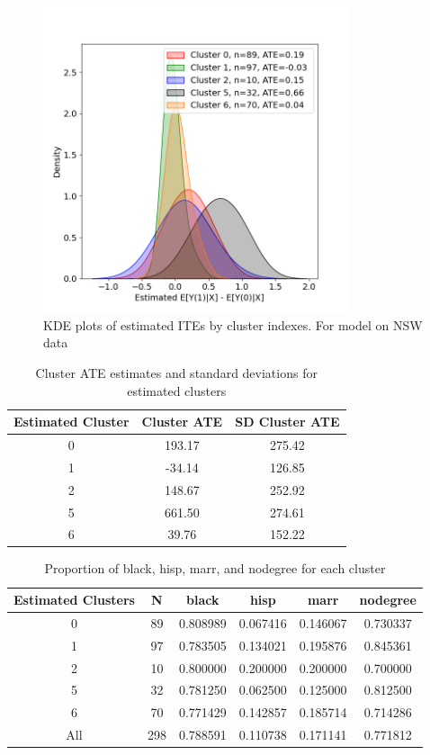 \documentclass{article}
\begin{document}
\begin{figure}[h]
  \centering
  \includegraphics[width=0.8\textwidth]{Plots/NSW_output_histogram.png}
  \caption{KDE plots of estimated ITEs by cluster indexes. For model on NSW data}
  \label{fig:nsw_histo}
\end{figure}

\begin{table}[H]
\centering
\label{tab:cluster_ate}
\begin{tabular}{c|c c}
\hline
\textbf{Estimated Cluster} & \textbf{Cluster ATE} & \textbf{SD Cluster ATE} \\ \hline
0 & 193.17 & 275.42 \\
1 & -34.14 & 126.85 \\
2 & 148.67 & 252.92 \\
5 & 661.50 & 274.61 \\
6 & 39.76 & 152.22 \\
\hline
\end{tabular}
\caption{Cluster ATE estimates and standard deviations for estimated clusters}
\label{tab:nsw_ate_results}
\end{table}

\begin{table}[H]
\centering
\label{tab:clusters}
\begin{tabular}{c|c|c|c|c|c}
\hline
\textbf{Estimated Clusters} & N &\textbf{black} & \textbf{hisp} & \textbf{marr} & \textbf{nodegree} \\ \hline
0 & 89 & 0.808989 & 0.067416 & 0.146067 & 0.730337 \\
1 & 97 & 0.783505 & 0.134021 & 0.195876 & 0.845361 \\
2 & 10 & 0.800000 & 0.200000 & 0.200000 & 0.700000 \\
5 & 32 & 0.781250 & 0.062500 & 0.125000 & 0.812500 \\
6 & 70 & 0.771429 & 0.142857 & 0.185714 & 0.714286 \\
\hline
All & 298 & 0.788591 & 0.110738 & 0.171141 & 0.771812  \\
\hline
\end{tabular}
\caption{Proportion of black, hisp, marr, and nodegree for each cluster}
\label{tab:nsw_cluster_covar_discrete}
\end{table}




\printbibliography
\end{document}
